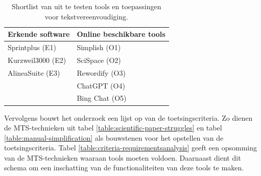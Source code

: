 \begin{center}
	\begin{table}[H]
		\begin{tabular}{ | m{6cm} | m{6cm} | } 
			\hline
			\textbf{Erkende software} & \textbf{Online beschikbare tools} \\
			\hline
			Sprintplus (E1) & Simplish (O1) \\
			Kurzweil3000 (E2) & SciSpace (O2) \\ 
			AlineaSuite (E3) & Rewordify (O3) \\
			& ChatGPT (O4) \\
			& Bing Chat (O5) \\
			\hline
		\end{tabular}
		\caption{Shortlist van uit te testen tools en toepassingen voor tekstvereenvoudiging.}
		\label{table:shortlist-tools}	
	\end{table}
\end{center}

Vervolgens bouwt het onderzoek een lijst op van de toetsingscriteria. Zo dienen de MTS-technieken uit tabel \ref{table:scientific-paper-struggles} en tabel \ref{table:manual-simplification} als bouwstenen voor het opstellen van de toetsingscriteria. Tabel \ref{table:criteria-requirementsanalysis} geeft een opsomming van de MTS-technieken waaraan tools moeten voldoen. Daarnaast dient dit schema om een inschatting van de functionaliteiten van deze tools te maken.

